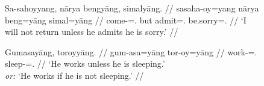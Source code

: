 \begin{figure}
\pex
\a\label{ex:unlessnaarya}\begingl
	\gla Sa-sahoyyang, nārya bengyāng, simalyāng. //
	\glb sa\til{}saha-oy=yang nārya beng=yāng simal=yāng //
	\glc \Iter{}\til{}come-\Neg{}=\TsgM{}.\Aarg{} but admit=\TsgM{}.\Aarg{}
		be.sorry=\TsgM{}.\Aarg{} //
	\glft `I will not return unless he admits he is sorry.' //
\endgl

\a\label{ex:unlessneg}\begingl
	\gla Gumasayāng, toroyyāng. //
	\glb gum-asa=yāng tor-oy=yāng //
	\glc work-\Hab{}=\TsgM{}.\Aarg{} sleep-\Neg{}=\TsgM{}.\Aarg{} //
	\glft `He works unless he is sleeping.'\\
		\textit{or:} `He works if he is not sleeping.' //
\endgl
\xe
\end{figure}

